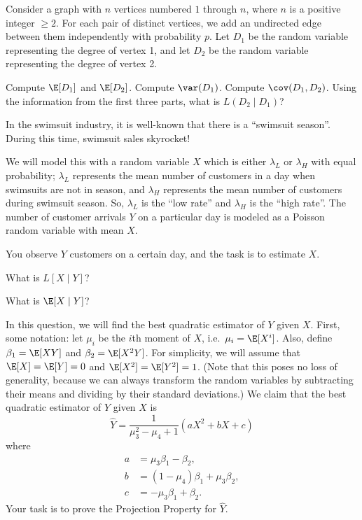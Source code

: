 
Consider a graph with $n$ vertices numbered $1$ through $n$, where $n$ is a positive integer $\ge 2$. For each pair of distinct vertices, we add an undirected edge between them independently with probability $p$. Let $D_1$ be the random variable representing the degree of vertex 1, and let $D_2$ be the random variable representing the degree of vertex 2. 

\begin{Parts}
	\Part Compute $\E[D_1]$ and $\E[D_2]$.
	\Part Compute $\var(D_1)$. 
	\Part Compute $\cov(D_1, D_2)$.
    \Part Using the information from the first three parts, what is $L(D_2 \mid D_1)$?
\end{Parts}



In the swimsuit industry, it is well-known that there is a ``swimsuit season''. During this time, swimsuit sales skyrocket!

We will model this with a random variable $X$ which is either $\lambda_L$ or $\lambda_H$ with equal probability; $\lambda_L$ represents the mean number of customers in a day when swimsuits are not in season, and $\lambda_H$ represents the mean number of customers during swimsuit season. So, $\lambda_L$ is the ``low rate'' and $\lambda_H$ is the ``high rate''. The number of customer arrivals $Y$ on a particular day is modeled as a Poisson random variable with mean $X$.

You observe $Y$ customers on a certain day, and the task is to estimate $X$.

\begin{Parts}
    
    \Part What is $L[X \mid Y]$?

    \Part What is $\E[X \mid Y]$?

\end{Parts}



In this question, we will find the best quadratic estimator of $Y$ given $X$. First, some notation: let $\mu_i$ be the $i$th moment of $X$, i.e.\ $\mu_i = \E[X^i]$. Also, define $\beta_1 = \E[XY]$ and $\beta_2 = \E[X^2 Y]$. For simplicity, we will assume that $\E[X] = \E[Y] = 0$ and $\E[X^2] = \E[Y^2] = 1$. (Note that this poses no loss of generality, because we can always transform the random variables by subtracting their means and dividing by their standard deviations.) We claim that the best quadratic estimator of $Y$ given $X$ is
\[
  \hat{Y} = \frac{1}{\mu_3^2 - \mu_4 + 1} (a X^2 + b X + c)
\]
where
\begin{align*}
  a &= \mu_3 \beta_1 - \beta_2, \\
  b &= (1 - \mu_4) \beta_1 + \mu_3 \beta_2, \\
  c &= -\mu_3 \beta_1 + \beta_2.
\end{align*}
Your task is to prove the Projection Property for $\hat{Y}$.

